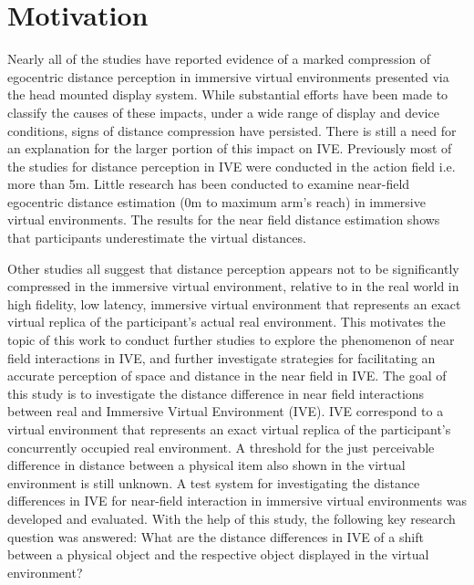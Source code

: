 \section{Motivation}
Nearly all of the studies have reported evidence of a marked compression of egocentric distance perception in immersive virtual environments presented via the head mounted display system\cite{willemsen2002perceived}\cite{armbruster2008depth}.
While substantial efforts have been made to classify the causes of these impacts, under a wide range of display and device conditions, signs of distance compression have persisted. There is still a need for an explanation for the larger portion of this impact on IVE. Previously most of the studies for distance perception in IVE were conducted in the action field i.e. more than 5m. Little research has been conducted to examine near-field egocentric distance estimation (0m to maximum arm’s reach) in immersive virtual environments. The results for the near field distance estimation shows that participants underestimate the virtual distances.\cite{napieralski2011near}\cite{armbruster2008depth}\cite{peer2017evaluating}\par
Other studies all suggest that distance perception appears not to be significantly compressed in the immersive virtual environment, relative to in the real world in high fidelity, low latency, immersive virtual environment that represents an exact virtual replica of the participant’s actual real environment\cite{interrante2006distance}.
This motivates the topic of this work to conduct further studies to explore the phenomenon of near field interactions in IVE, and further investigate strategies for facilitating an accurate perception of space and distance in the near field in IVE.
The goal of this study is to investigate the distance difference in near field interactions between real and Immersive Virtual Environment (IVE). IVE correspond to a virtual environment that represents an exact virtual replica of the participant’s concurrently occupied real environment.  A threshold for the just perceivable difference in distance between a physical item also shown in the virtual environment is still unknown. A test system for investigating the distance differences in IVE for near-field interaction in immersive virtual environments was developed and evaluated. With the help of this study, the following key research question was answered: What are the distance differences in IVE of a shift between a physical object and the respective object displayed in the virtual environment?

